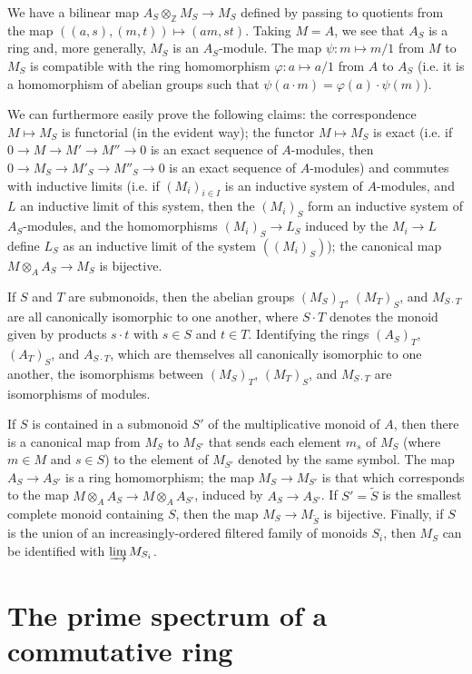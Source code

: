\documentclass{article}
\theoremstyle{plain}
\theoremstyle{definition}
\newcommand{\oldpage}[1]{\marginpar{\footnotesize$\Big\vert$ \textit{p.~#1}}}
\begin{document}
We have a bilinear map $A_S\otimes_\mathbb{Z}M_S\to M_S$ defined by passing to quotients from the map $((a,s),(m,t))\mapsto(am,st)$.
Taking $M=A$, we see that $A_S$ is a ring and, more generally, $M_S$ is an $A_S$-module.
The map $\psi\colon m\mapsto m/1$ from $M$ to $M_S$ is compatible with the ring homomorphism $\varphi\colon a\mapsto a/1$ from $A$ to $A_S$ (i.e. it is a homomorphism of abelian groups such that $\psi(a\cdot m)=\varphi(a)\cdot\psi(m)$).

We can furthermore easily prove the following claims:
the correspondence $M\mapsto M_S$ is functorial (in the evident way);
the functor $M\mapsto M_S$ is exact (i.e. if $0\to M\to M'\to M''\to 0$ is an exact sequence of $A$-modules, then $0\to M_S\to M'_S\to M''_S\to 0$ is an exact sequence of $A$-modules) and commutes with inductive limits (i.e. if $(M_i)_{i\in I}$ is an inductive system of $A$-modules, and $L$ an inductive limit of this system, then the $(M_i)_S$ form an inductive system of $A_S$-modules, and the homomorphisms $(M_i)_S\to L_S$ induced by the $M_i\to L$ define $L_S$ as an inductive limit of the system $((M_i)_S)$); the canonical map $M\otimes_A A_S\to M_S$ is bijective.

If $S$ and $T$ are submonoids, then the abelian groups $(M_S)_T$, $(M_T)_S$, and $M_{S\cdot T}$ are all canonically isomorphic to one another, where $S\cdot T$ denotes the monoid given by products $s\cdot t$ with $s\in S$ and $t\in T$.
Identifying the rings $(A_S)_T$, $(A_T)_S$, and $A_{S\cdot T}$, which are themselves all canonically isomorphic to one another, the isomorphisms between $(M_S)_T$, $(M_T)_S$, and $M_{S\cdot T}$ are isomorphisms of modules.

\oldpage{1-03}
If $S$ is contained in a submonoid $S'$ of the multiplicative monoid of $A$, then there is a canonical map from $M_S$ to $M_{S'}$ that sends each element $m_s$ of $M_S$ (where $m\in M$ and $s\in S$) to the element of $M_{S'}$ denoted by the same symbol.
The map $A_S\to A_{S'}$ is a ring homomorphism;
the map $M_S\to M_{S'}$ is that which corresponds to the map $M\otimes_A A_S\to M\otimes_A A_{S'}$, induced by $A_S\to A_{S'}$.
If $S'=\widetilde{S}$ is the smallest complete monoid containing $S$, then the map $M_S\to M_{\widetilde{S}}$ is bijective.
Finally, if $S$ is the union of an increasingly-ordered filtered family of monoids $S_i$, then $M_S$ can be identified with $\varinjlim M_{S_i}$.


\section{The prime spectrum of a commutative ring}
\label{section2}
\end{document}
